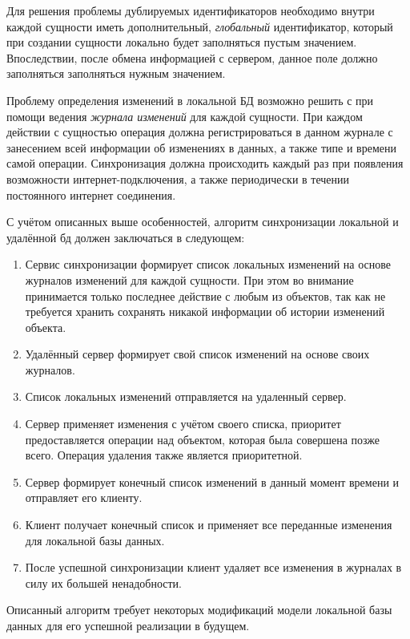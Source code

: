 Для решения проблемы дублируемых идентификаторов необходимо внутри каждой сущности иметь дополнительный, \emph{глобальный} идентификатор, который при создании сущности локально будет заполняться пустым значением.
Впоследствии, после обмена информацией с сервером, данное поле должно заполняться заполняться нужным значением.

Проблему определения изменений в локальной БД возможно решить с при помощи ведения \emph{журнала изменений} для каждой сущности.
При каждом действии с сущностью операция должна регистрироваться в данном журнале с занесением всей информации об изменениях в данных, а также типе и времени самой операции.
Синхронизация должна происходить каждый раз при появления возможности интернет-подключения, а также периодически в течении постоянного интернет соединения.

С учётом описанных выше особенностей, алгоритм синхронизации локальной и удалённой бд должен заключаться в следующем:
\begin{enumerate}
    \item Сервис синхронизации формирует список локальных изменений на основе журналов изменений для каждой сущности.
    При этом во внимание принимается только последнее действие с любым из объектов, так как не требуется хранить сохранять никакой информации об истории изменений объекта.
    \item Удалённый сервер формирует свой список изменений на основе своих журналов.
    \item Список локальных изменений отправляется на удаленный сервер.
    \item Сервер применяет изменения с учётом своего списка, приоритет предоставляется операции над объектом, которая была совершена позже всего.
    Операция удаления также является приоритетной.
    \item Сервер формирует конечный список изменений в данный момент времени и отправляет его клиенту.
    \item Клиент получает конечный список и применяет все переданные изменения для локальной базы данных.
    \item После успешной синхронизации клиент удаляет все изменения в журналах в силу их большей ненадобности.
\end{enumerate}

Описанный алгоритм требует некоторых модификаций модели локальной базы данных для его успешной реализации в будущем.
